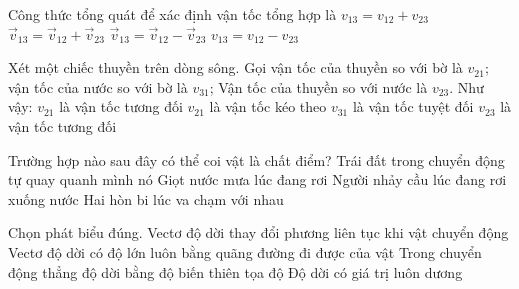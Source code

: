 \begin{ex}
Công thức tổng quát để xác định vận tốc tổng hợp là
\choice
{$v_{13}=v_{12}+v_{23}$}
{\True $\vec{v}_{13} = \vec{v}_{12} + \vec{v}_{23}$}
{$\vec{v}_{13} = \vec{v}_{12} - \vec{v}_{23}$}
{$v_{13}=v_{12}-v_{23}$}
\end{ex}


\begin{ex}
Xét một chiếc thuyền trên dòng sông. Gọi vận tốc của thuyền so với bờ là $v_{21}$; vận tốc của nước so với bờ là $v_{31}$; Vận tốc của thuyền so với nước là $v_{23}$. Như vậy:
\choice
{\True $v_{21}$ là vận tốc tương đối}
{$v_{21}$ là vận tốc kéo theo}
{$v_{31}$ là vận tốc tuyệt đối}
{$v_{23}$ là vận tốc tương đối}
\end{ex}


\begin{ex}
Trường hợp nào sau đây có thể coi vật là chất điểm?
\choice
{Trái đất trong chuyển động tự quay quanh mình nó}
{\True Giọt nước mưa lúc đang rơi}
{Người nhảy cầu lúc đang rơi xuống nước}
{Hai hòn bi lúc va chạm với nhau}
\end{ex}


\begin{ex}
Chọn phát biểu đúng.
\choice
{Vectơ độ dời thay đổi phương liên tục khi vật chuyển động}
{Vectơ độ dời có độ lớn luôn bằng quãng đường đi được của vật}
{\True Trong chuyển động thẳng độ dời bằng độ biến thiên tọa độ}
{Độ dời có giá trị luôn dương}
\end{ex}

